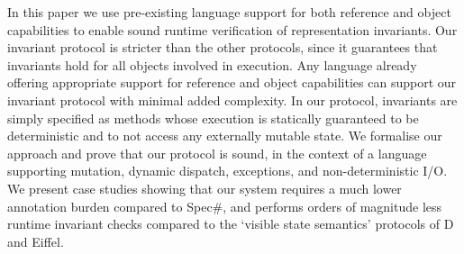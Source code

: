 In this paper we use pre-existing language support for both reference and object capabilities to enable sound runtime verification of representation invariants.
Our invariant protocol is stricter than the other  protocols, since it guarantees that invariants hold for all objects involved in execution.
Any language already offering appropriate support for reference and object capabilities can support our invariant protocol with minimal added complexity.
In our protocol, invariants are simply specified as methods whose execution is statically guaranteed to be deterministic and to not access any externally mutable state.
We formalise our approach and prove that our protocol is sound, in the context of a language supporting mutation, dynamic dispatch, exceptions, and non-deterministic I/O.
We present case studies showing that our system requires a much lower annotation burden compared to Spec\#, and performs orders of magnitude less runtime invariant checks compared to the `visible state semantics' protocols of D and Eiffel. 
